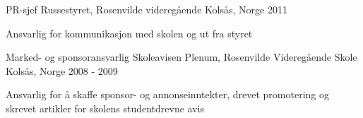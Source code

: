 \begin{cventries}
    \cventry
    {PR-sjef}
    {Russestyret, Rosenvilde videregående}
    {Kolsås, Norge}
    {2011}
    {
      \begin{cvitems}
        \item {Ansvarlig for kommunikasjon med skolen og ut fra styret}
      \end{cvitems}
    }
    
    \cventry
    {Marked- og sponsoransvarlig}
    {Skoleavisen Plenum, Rosenvilde Videregående Skole}
    {Kolsås, Norge}
    {2008 - 2009}
    {
      \begin{cvitems}
        \item {Ansvarlig for å skaffe sponsor- og annonseinntekter, drevet promotering og skrevet artikler for skolens studentdrevne avis}
      \end{cvitems}
    }
    
\end{cventries}

